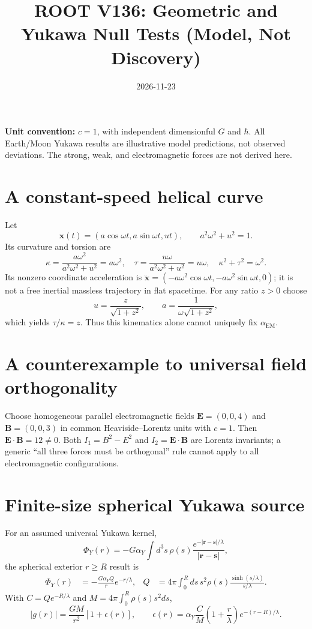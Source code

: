 \documentclass[11pt]{article}
\title{ROOT V136: Geometric and Yukawa Null Tests (Model, Not Discovery)}
\date{2026-11-23}
\begin{document}
\maketitle
\noindent\textbf{Unit convention:} $c=1$, with independent dimensionful $G$ and $\hbar$. All Earth/Moon Yukawa results are illustrative model predictions, not observed deviations. The strong, weak, and electromagnetic forces are not derived here.
\section{A constant-speed helical curve}
Let
\begin{equation}
\mathbf{x}(t)=(a\cos \omega t,a\sin\omega t,ut),\qquad
  a^2\omega^2+u^2=1.
\end{equation}
Its curvature and torsion are
\begin{equation}
\kappa=\frac{a\omega^2}{a^2\omega^2+u^2}=a\omega^2,
\quad \tau=\frac{u\omega}{a^2\omega^2+u^2}=u\omega,
\quad \boxed{\kappa^2+\tau^2=\omega^2}.
\end{equation}
Its nonzero coordinate acceleration is $\ddot{\mathbf x}=(-a\omega^2\cos \omega t,-a\omega^2\sin\omega t,0)$; it is not a free inertial massless trajectory in flat spacetime.
For any ratio $z>0$ choose
\begin{equation}
 u=\frac{z}{\sqrt{1+z^2}},\qquad a=\frac{1}{\omega\sqrt{1+z^2}},
\end{equation}
which yields $\tau/\kappa=z$. Thus this kinematics alone cannot uniquely fix $\alpha_{\mathrm{EM}}$.
\section{A counterexample to universal field orthogonality}
Choose homogeneous parallel electromagnetic fields $\mathbf E=(0,0,4)$ and $\mathbf B=(0,0,3)$ in common Heaviside--Lorentz units with $c=1$. Then $\mathbf E\cdot\mathbf B=12\neq0$. Both $I_1=B^2-E^2$ and $I_2=\mathbf E\cdot\mathbf B$ are Lorentz invariants; a generic ``all three forces must be orthogonal'' rule cannot apply to all electromagnetic configurations.
\section{Finite-size spherical Yukawa source}
For an assumed universal Yukawa kernel,
\begin{equation}
\Phi_Y(r)=-G\alpha_Y\int d^3s\,\rho(s)
  \frac{e^{-|\mathbf r-\mathbf s|/\lambda}}{|\mathbf r-\mathbf s|},
\end{equation}
the spherical exterior $r\ge R$ result is
\begin{align}
\Phi_Y(r)&=-\frac{G\alpha_YQ}{r}e^{-r/\lambda},&
Q&=4\pi\int_0^R ds\,s^2\rho(s)
     \frac{\sinh(s/\lambda)}{s/\lambda}.
\end{align}
With $C=Qe^{-R/\lambda}$ and $M=4\pi\int_0^R\rho(s)s^2ds$,
\begin{equation}
|g(r)|=\frac{GM}{r^2}[1+\epsilon(r)],\qquad
\epsilon(r)=\alpha_Y\frac{C}{M}
      \left(1+\frac{r}{\lambda}\right)e^{-(r-R)/\lambda}.
\end{equation}
\end{document}
